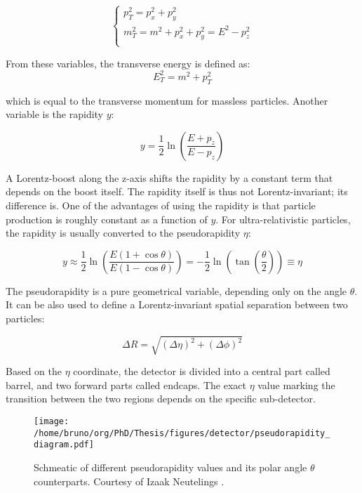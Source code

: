 \documentclass[11pt]{article}
\begin{document}
\begin{equation}
\label{eq:transverse_momenta}
\begin{cases}
p^2_T = p^2_x + p^2_y \\
m^2_T = m^2 + p^2_x + p^2_y = E^2 - p^2_z \\
\end{cases}
\end{equation}


From these variables, the transverse energy is defined as:
\begin{equation}
\label{eq:transverse energy}
E^2_T = m^2 + p^2_T
\end{equation}

which is equal to the transverse momentum for massless particles.
Another variable is the rapidity \(y\):

\begin{equation}
\label{eq:rapidity}
y = \frac{1}{2} \ln \left( \frac{E + p_z}{E - p_z} \right)
\end{equation}

A Lorentz-boost along the z-axis shifts the rapidity by a constant term that depends on the boost itself.
The rapidity itself is thus not Lorentz-invariant; its difference is.
One of the advantages of using the rapidity is that particle production is roughly constant as a function of \(y\).
For ultra-relativistic particles, the rapidity is usually converted to the pseudorapidity \(\eta\):


\begin{equation}
\label{eq:pseudo-rapidity}
y \approx \frac{1}{2} \ln \left( \frac{E(1 + \cos \theta)}{E(1 - \cos \theta)} \right)
= -\frac{1}{2} \ln \left( \tan \left( \frac{\theta}{2} \right) \right)
\equiv \eta
\end{equation}

The pseudorapidity is a pure geometrical variable, depending only on the angle \(\theta\).
It can be also used to define a Lorentz-invariant spatial separation between two particles:

\begin{equation}
\label{eq:deltar}
\Delta R = \sqrt{(\Delta \eta)^2 + (\Delta \phi)^2}
\end{equation}

Based on the \(\eta\) coordinate, the detector is divided into a central part called barrel, and two forward parts called endcaps.
The exact \(\eta\) value marking the transition between the two regions depends on the specific sub-detector.

\begin{figure}
\texttt{[image: /home/bruno/org/PhD/Thesis/figures/detector/pseudorapidity\_diagram.pdf]}
\caption{\label{fig:pseudorapidity}Schmeatic of different pseudorapidity values and its polar angle \(\theta\) counterparts. Courtesy of Izaak Neutelings \cite{izaak_neutelings}.}
\end{figure}
\end{document}
